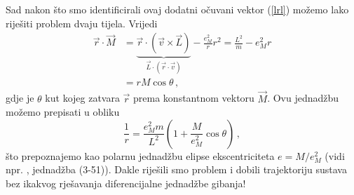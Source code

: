 Sad nakon što smo identificirali ovaj
dodatni očuvani vektor (\ref{lrl}) možemo lako riješiti problem
dvaju tijela. Vrijedi
\begin{equation}
\begin{split}
 \vec{r}\cdot\vec{M} &= \underbrace{\vec{r}\cdot(\vec{v}\times\vec{L})}_{
\vec{L}\cdot(\vec{r}\cdot\vec{v})} - \frac{e_{M}^2}{r} r^2
= \frac{L^2}{m} - e_{M}^2 r \\
&= r M \cos \theta \,,
\end{split}
\end{equation}
gdje je $\theta$ kut kojeg zatvara $\vec{r}$ prema konstantnom vektoru
$\vec{M}$. Ovu jednadžbu možemo prepisati u obliku
\begin{equation}
\frac{1}{r} = \frac{e_{M}^2 m}{L^2} \left(1+\frac{M}{e_{M}^2} \cos\theta\right) \,,
\end{equation}
što prepoznajemo kao polarnu jednadžbu elipse ekscentriciteta $e=M/e_{M}^2$
(vidi npr. \cite{Goldstein:1980}, jednadžba (3-51)). Dakle riješili smo problem i
dobili trajektoriju sustava bez ikakvog rješavanja diferencijalne
jednadžbe gibanja!

